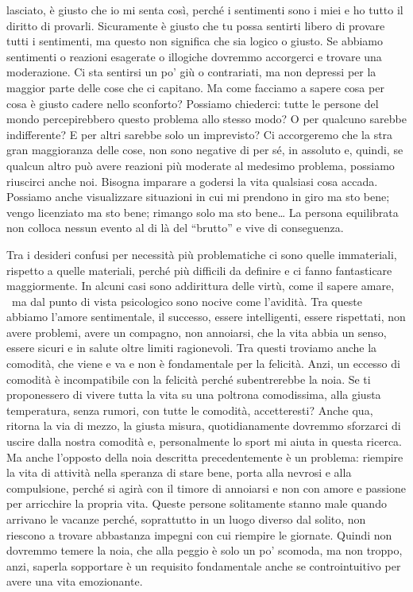 \documentclass[12pt]{book} %
\begin{document}
lasciato, è giusto che io mi senta così, perché i sentimenti sono i miei e ho tutto il diritto di provarli. Sicuramente
è giusto che tu possa sentirti libero di provare tutti i sentimenti, ma questo non significa che sia logico o giusto.
Se abbiamo sentimenti o reazioni esagerate o illogiche dovremmo accorgerci e trovare una moderazione. Ci sta sentirsi
un po' giù o contrariati, ma non depressi per la maggior parte delle cose che ci capitano. Ma come
facciamo a sapere cosa per cosa è giusto cadere nello sconforto? Possiamo chiederci: tutte le persone del mondo
percepirebbero questo problema allo stesso modo? O per qualcuno sarebbe indifferente? E per altri sarebbe solo un
imprevisto? Ci accorgeremo che la stra gran maggioranza delle cose, non sono negative di per sé, in assoluto e, quindi,
se qualcun altro può avere reazioni più moderate al medesimo problema, possiamo riuscirci anche noi. Bisogna imparare a
godersi la vita qualsiasi cosa accada. Possiamo anche visualizzare situazioni in cui mi prendono in giro ma sto bene;
vengo licenziato ma sto bene; rimango solo ma sto bene… La persona equilibrata non colloca nessun evento al di là del
“brutto” e vive di conseguenza.

Tra i desideri confusi per necessità più problematiche ci sono quelle immateriali, rispetto a quelle materiali, perché
più difficili da definire e ci fanno fantasticare maggiormente. In alcuni casi sono addirittura delle virtù, come il
sapere amare, \ ma dal punto di vista psicologico sono nocive come l'avidità. Tra queste abbiamo
l'amore sentimentale, il successo, essere intelligenti, essere rispettati, non avere problemi,
avere un compagno, non annoiarsi, che la vita abbia un senso, essere sicuri e in salute oltre limiti ragionevoli. Tra
questi troviamo anche la comodità, che viene e va e non è fondamentale per la felicità. Anzi, un eccesso di comodità è
incompatibile con la felicità perché subentrerebbe la noia. Se ti proponessero di vivere tutta la vita su una poltrona
comodissima, alla giusta temperatura, senza rumori, con tutte le comodità, accetteresti? Anche qua, ritorna la via di
mezzo, la giusta misura, quotidianamente dovremmo sforzarci di uscire dalla nostra comodità e, personalmente lo sport
mi aiuta in questa ricerca. Ma anche l'opposto della noia descritta precedentemente è un problema:
riempire la vita di attività nella speranza di stare bene, porta alla nevrosi e alla compulsione, perché si agirà con
il timore di annoiarsi e non con amore e passione per arricchire la propria vita. Queste persone solitamente stanno
male quando arrivano le vacanze perché, soprattutto in un luogo diverso dal solito, non riescono a trovare abbastanza
impegni con cui riempire le giornate. Quindi non dovremmo temere la noia, che alla peggio è solo un
po' scomoda, ma non troppo, anzi, saperla sopportare è un requisito fondamentale anche se
controintuitivo per avere una vita emozionante.
\end{document}
